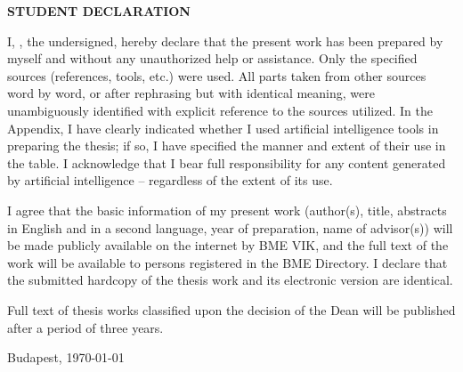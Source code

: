 \begin{center}
\large
\textbf{STUDENT DECLARATION}\\
\end{center}

I, \emph{\vikszerzoKeresztnev{} \vikszerzoVezeteknev}, the undersigned, hereby declare that the present \vikdoktipus{} work has been prepared by myself and without any unauthorized help or assistance. Only the specified sources (references, tools, etc.) were used. All parts taken from other sources word by word, or after rephrasing but with identical meaning, were unambiguously identified with explicit reference to the sources utilized. In the Appendix, I have clearly indicated whether I used artificial intelligence tools in preparing the thesis; if so, I have specified the manner and extent of their use in the table. I acknowledge that I bear full responsibility for any content generated by artificial intelligence -- regardless of the extent of its use.

I agree that the basic information of my present work (author(s), title, abstracts in English and in a second language, year of preparation, name of advisor(s)) will be made publicly available on the internet by BME VIK, and the full text of the work will be available to persons registered in the BME Directory. I declare that the submitted hardcopy of the thesis work and its electronic version are identical. 

Full text of thesis works classified upon the decision of the Dean will be published after a period of three years.

\begin{flushleft}
\vspace*{1cm}
Budapest, \today
\end{flushleft}

\begin{flushright}
 \vspace*{1cm}
 \makebox[7cm]{\rule{6cm}{.4pt}}\\
 \makebox[7cm]{\emph{\vikszerzoKeresztnev{} \vikszerzoVezeteknev}}\\
\end{flushright}
\thispagestyle{empty}

\vfill
\clearpage
\thispagestyle{empty} %

\selectthesislanguage
